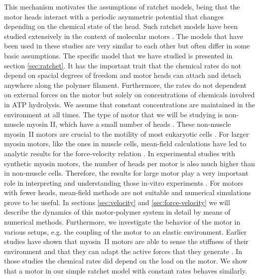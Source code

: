 \documentclass[aps,pre,twocolumn,showpacs,showkeys,superscriptaddress,floatfix]{revtex4-1}
\begin{document}
This mechanism motivates the assumptions of ratchet models, being that the motor heads interact with a periodic asymmetric potential that changes depending on the chemical state of the head. 
Such ratchet models have been studied extensively in the context of molecular motors \cite{reimann2002brownian,astumian1994fluctuation,astumian1996mechanochemical,julicher1997modeling,Reimann2002introduction,julicher1997spontaneous,peskin1995correlation,huxley1969mechanism,huxley1971proposed}.
The models that have been used in these studies are very similar to each other but often differ in some basic assumptions.
The specific model that we have studied is presented in section \ref{sec:ratchet}. 
It has the important trait that the chemical rates do not depend on spacial degrees of freedom and motor heads can attach and detach anywhere along the polymer filament.
Furthermore, the rates do not dependent on external forces on the motor but solely on concentrations of chemicals involved in ATP hydrolysis. We assume that constant concentrations are maintained in the environment at all times. 
The type of motor that we will be studying is non-muscle myosin II, which have a small number of heads \cite{pollard1982structure}. 
These non-muscle myosin~II motors are crucial to the motility of most eukaryotic cells \cite{vicente2009non}.
For larger myosin motors, like the ones in muscle cells, mean-field calculations have led to analytic results for the force-velocity relation \cite{julicher1997modeling}.
In experimental studies with synthetic myosin motors, the number of heads per motor is also much higher than in non-muscle cells. 
Therefore, the results for large motor play a very important role in interpreting and understanding those in-vitro experiments \cite{brown2009cross-correlated}.
For motors with fewer heads, mean-field methods are not suitable and numerical simulations prove to be useful.
In sections \ref{sec:velocity} and \ref{sec:force-velocity} we will describe the dynamics of this motor-polymer system in detail by means of numerical methods.
Furthermore, we investigate the behavior of the motor in various setups, e.g. the coupling of the motor to an elastic environment.
Earlier studies have shown that myosin~II motors are able to sense the stiffness of their environment and that they can adapt the active forces that they generate \cite{stam2015isoforms,albert2014stochastic}.
In those studies the chemical rates did depend on the load on the motor. 
We show that a motor in our simple ratchet model with constant rates behaves similarly.
\end{document}
